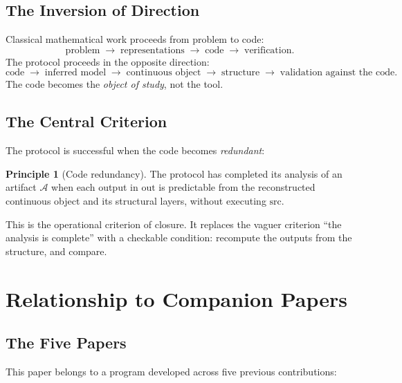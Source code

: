 \documentclass[11pt,a4paper]{article}
\theoremstyle{definition}
\newtheorem{principle}[definition]{Principle}
\theoremstyle{plain}
\newcommand{\Acal}{\mathcal{A}}
\begin{document}
\subsection{The Inversion of Direction}

Classical mathematical work proceeds from problem to code:
\[
  \text{problem} \;\longrightarrow\; \text{representations}
  \;\longrightarrow\; \text{code} \;\longrightarrow\;
  \text{verification}.
\]
The protocol proceeds in the opposite direction:
\[
  \text{code} \;\longrightarrow\; \text{inferred model}
  \;\longrightarrow\; \text{continuous object}
  \;\longrightarrow\; \text{structure} \;\longrightarrow\;
  \text{validation against the code}.
\]
The code becomes the \emph{object of study}, not the tool.

\subsection{The Central Criterion}

The protocol is successful when the code becomes
\emph{redundant}:

\begin{principle}[Code redundancy]\label{pr:redundancy}
The protocol has completed its analysis of an artifact $\Acal$
when each output in $\mathrm{out}$ is predictable from the
reconstructed continuous object and its structural layers, without
executing $\mathrm{src}$.
\end{principle}

This is the operational criterion of closure. It replaces the
vaguer criterion ``the analysis is complete'' with a checkable
condition: recompute the outputs from the structure, and compare.

\section{Relationship to Companion Papers}
\label{sec:relationship}

\subsection{The Five Papers}

This paper belongs to a program developed across five previous
contributions:
\end{document}
